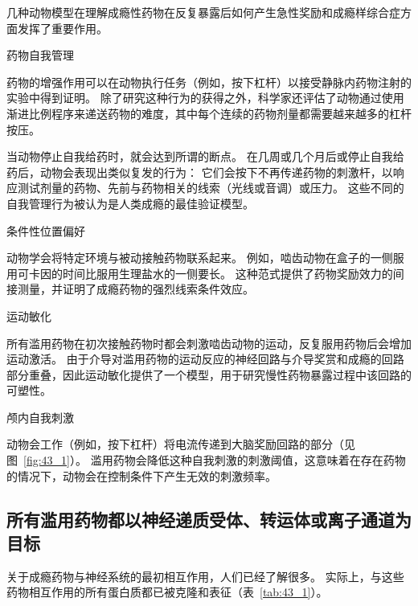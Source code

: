 \begin{proposition}[药物成瘾的动物模型] \label{box:43_1}
	
	\quad \quad 几种动物模型在理解成瘾性药物在反复暴露后如何产生急性奖励和成瘾样综合症方面发挥了重要作用。
	
	\quad \quad 药物自我管理
	
	\quad \quad 药物的增强作用可以在动物执行任务（例如，按下杠杆）以接受静脉内药物注射的实验中得到证明。
	除了研究这种行为的获得之外，科学家还评估了动物通过使用渐进比例程序来递送药物的难度，其中每个连续的药物剂量都需要越来越多的杠杆按压。
	
	\quad \quad 当动物停止自我给药时，就会达到所谓的断点。
	在几周或几个月后或停止自我给药后，动物会表现出类似复发的行为：
	它们会按下不再传递药物的刺激杆，以响应测试剂量的药物、先前与药物相关的线索（光线或音调）或压力。
	这些不同的自我管理行为被认为是人类成瘾的最佳验证模型。
	
	\quad \quad 条件性位置偏好
	
	\quad \quad 动物学会将特定环境与被动接触药物联系起来。
	例如，啮齿动物在盒子的一侧服用可卡因的时间比服用生理盐水的一侧要长。
	这种范式提供了药物奖励效力的间接测量，并证明了成瘾药物的强烈线索条件效应。
	
	\quad \quad 运动敏化
	
	\quad \quad 所有滥用药物在初次接触药物时都会刺激啮齿动物的运动，反复服用药物后会增加运动激活。
	由于介导对滥用药物的运动反应的神经回路与介导奖赏和成瘾的回路部分重叠，因此运动敏化提供了一个模型，用于研究慢性药物暴露过程中该回路的可塑性。
	
	\quad \quad 颅内自我刺激
	
	\quad \quad 动物会工作（例如，按下杠杆）将电流传递到大脑奖励回路的部分（见图~\ref{fig:43_1}）。
	滥用药物会降低这种自我刺激的刺激阈值，这意味着在存在药物的情况下，动物会在控制条件下产生无效的刺激频率。
	
\end{proposition}



\subsection{所有滥用药物都以神经递质受体、转运体或离子通道为目标}

关于成瘾药物与神经系统的最初相互作用，人们已经了解很多。
实际上，与这些药物相互作用的所有蛋白质都已被克隆和表征（表~\ref{tab:43_1}）。



